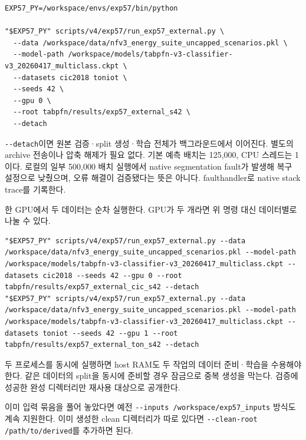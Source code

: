 \begin{Verbatim}[breaklines=true,breakanywhere=true,fontsize=\scriptsize]
EXP57_PY=/workspace/envs/exp57/bin/python

"$EXP57_PY" scripts/v4/exp57/run_exp57_external.py \
  --data /workspace/data/nfv3_energy_suite_uncapped_scenarios.pkl \
  --model-path /workspace/models/tabpfn-v3-classifier-v3_20260417_multiclass.ckpt \
  --datasets cic2018 toniot \
  --seeds 42 \
  --gpu 0 \
  --root tabpfn/results/exp57_external_s42 \
  --detach

\end{Verbatim}
\texttt{-\allowbreak{}-\allowbreak{}detach\allowbreak{}}이면 원본 검증·split 생성·학습 전체가 백그라운드에서 이어진다. 별도의 archive 전송이나 압축 해제가 필요 없다. 기본 예측 배치는 125,000, CPU 스레드는 1이다. 로컬의 일부 500,000 배치 실행에서 native segmentation fault가 발생해 복구 설정으로 낮췄으며, 오류 해결이 검증됐다는 뜻은 아니다. faulthandler로 native stack trace를 기록한다.

한 GPU에서 두 데이터는 순차 실행한다. GPU가 두 개라면 위 명령 대신 데이터별로 나눌 수 있다.


\begin{Verbatim}[breaklines=true,breakanywhere=true,fontsize=\scriptsize]
"$EXP57_PY" scripts/v4/exp57/run_exp57_external.py --data /workspace/data/nfv3_energy_suite_uncapped_scenarios.pkl --model-path /workspace/models/tabpfn-v3-classifier-v3_20260417_multiclass.ckpt --datasets cic2018 --seeds 42 --gpu 0 --root tabpfn/results/exp57_external_cic_s42 --detach
"$EXP57_PY" scripts/v4/exp57/run_exp57_external.py --data /workspace/data/nfv3_energy_suite_uncapped_scenarios.pkl --model-path /workspace/models/tabpfn-v3-classifier-v3_20260417_multiclass.ckpt --datasets toniot --seeds 42 --gpu 1 --root tabpfn/results/exp57_external_ton_s42 --detach

\end{Verbatim}
두 프로세스를 동시에 실행하면 host RAM도 두 작업의 데이터 준비·학습을 수용해야 한다. 같은 데이터의 split을 동시에 준비할 경우 잠금으로 중복 생성을 막는다. 검증에 성공한 완성 디렉터리만 재사용 대상으로 공개한다.

이미 입력 묶음을 풀어 놓았다면 예전 \texttt{-\allowbreak{}-\allowbreak{}inputs\allowbreak{} /\allowbreak{}\allowbreak{}worksp\allowbreak{}ace/\allowbreak{}\allowbreak{}exp5\allowbreak{}7\_\allowbreak{}\allowbreak{}inputs\allowbreak{}} 방식도 계속 지원한다. 이미 생성한 clean 디렉터리가 따로 있다면 \texttt{-\allowbreak{}-\allowbreak{}clean-\allowbreak{}root /\allowbreak{}\allowbreak{}pa\allowbreak{}th/\allowbreak{}\allowbreak{}to/\allowbreak{}\allowbreak{}de\allowbreak{}rived}를 추가하면 된다.

